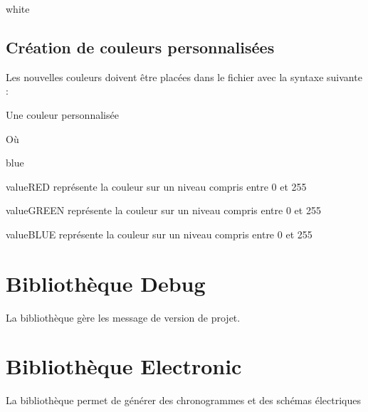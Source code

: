 {\begin{items}{white}{\Bullet}
    \item {}
    \item {}
    \item {}
    \item {}
    \item {}
    \item {}

\end{items}


\section{Création de couleurs personnalisées}

Les nouvelles couleurs doivent être placées dans le fichier  avec la syntaxe suivante : 

\begin{Latex}{Une couleur personnalisée}
\end{Latex}

Où 
\begin{items}{blue}{\Bullet}
    \item valueRED représente la couleur  sur un niveau compris entre 0 et 255
    \item valueGREEN représente la couleur  sur un niveau compris entre 0 et 255
    \item valueBLUE représente la couleur   sur un niveau compris entre 0 et 255
\end{items}


\chapter{Bibliothèque Debug} 

La bibliothèque  gère les message de version de projet.

\chapter{Bibliothèque Electronic}

La bibliothèque  permet de générer des chronogrammes et des schémas électriques



}

